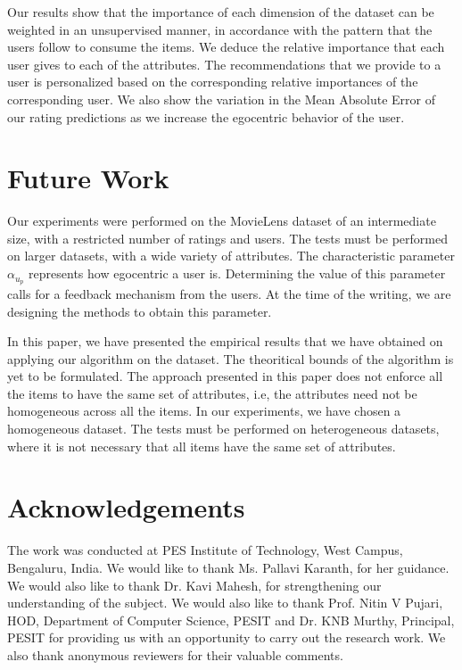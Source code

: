 \documentclass{acm_proc_article-sp}
\begin{document}
Our results show that the importance of each dimension of the dataset can be weighted in an unsupervised manner, in accordance with the pattern that the users follow to consume the items. We deduce the relative importance that each user gives to each of the attributes. The recommendations that we provide to a user is personalized based on the corresponding relative importances of the corresponding user. We also show the variation in the Mean Absolute Error of our rating predictions as we increase the egocentric behavior of the user.

\section{Future Work}
Our experiments were performed on the MovieLens dataset of an intermediate size, with a restricted number of ratings and users. The tests must be performed on larger datasets, with a wide variety of attributes. The characteristic parameter $\alpha_{u_p}$ represents how egocentric a user is. Determining the value of this parameter calls for a feedback mechanism from the users. At the time of the writing, we are designing the methods to obtain this parameter.

In this paper, we have presented the empirical results that we have obtained on applying our algorithm on the dataset. The theoritical bounds of the algorithm is yet to be formulated. The approach presented in this paper does not enforce all the items to have the same set of attributes, i.e, the attributes need not be homogeneous across all the items. In our experiments, we have chosen a homogeneous dataset. The tests must be performed on heterogeneous datasets, where it is not necessary that all items have the same set of attributes.\\

\section{Acknowledgements}
The work was conducted at PES Institute of Technology, West Campus, Bengaluru, India. We would like to thank Ms. Pallavi Karanth, for her guidance. We would also like to thank Dr. Kavi Mahesh, for strengthening our understanding of the subject. We would also like to thank Prof. Nitin V Pujari, HOD, Department of Computer Science, PESIT and Dr. KNB Murthy, Principal, PESIT for providing us with an opportunity to carry out the research work. We also thank anonymous reviewers for their valuable comments.



\end{document}
